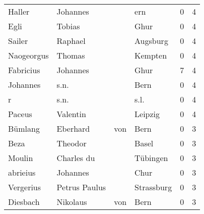 \documentclass[10pt,a4paper,landscape]{article}
\begin{document}
\begin{longtable}{llllrr}
                   Haller &                           Johannes &             &                                         ern &          0 &         4 \\
                     Egli &                             Tobias &             &                                        Ghur &          0 &         4 \\
                   Sailer &                            Raphael &             &                                    Augsburg &          0 &         4 \\
               Naogeorgus &                             Thomas &             &                                     Kempten &          0 &         4 \\
                Fabricius &                           Johannes &             &                                        Ghur &          7 &         4 \\
                 Johannes &                               s.n. &             &                                        Bern &          0 &         4 \\
                        r &                               s.n. &             &                                        s.l. &          0 &         4 \\
                   Paceus &                           Valentin &             &                                     Leipzig &          0 &         4 \\
                  Bümlang &                           Eberhard &         von &                                        Bern &          0 &         3 \\
                     Beza &                            Theodor &             &                                       Basel &          0 &         3 \\
                   Moulin &                         Charles du &             &                                    Tübingen &          0 &         3 \\
                 abrieius &                           Johannes &             &                                        Chur &          0 &         3 \\
                Vergerius &                      Petrus Paulus &             &                                  Strassburg &          0 &         3 \\
                 Diesbach &                           Nikolaus &         von &                                        Bern &          0 &         3 \\

\end{longtable}
\end{document}
